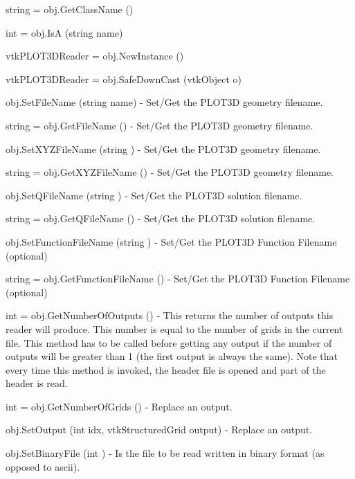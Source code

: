 \begin{DoxyItemize}
\item {\ttfamily string = obj.\-Get\-Class\-Name ()}  
\item {\ttfamily int = obj.\-Is\-A (string name)}  
\item {\ttfamily vtk\-P\-L\-O\-T3\-D\-Reader = obj.\-New\-Instance ()}  
\item {\ttfamily vtk\-P\-L\-O\-T3\-D\-Reader = obj.\-Safe\-Down\-Cast (vtk\-Object o)}  
\item {\ttfamily obj.\-Set\-File\-Name (string name)} -\/ Set/\-Get the P\-L\-O\-T3\-D geometry filename.  
\item {\ttfamily string = obj.\-Get\-File\-Name ()} -\/ Set/\-Get the P\-L\-O\-T3\-D geometry filename.  
\item {\ttfamily obj.\-Set\-X\-Y\-Z\-File\-Name (string )} -\/ Set/\-Get the P\-L\-O\-T3\-D geometry filename.  
\item {\ttfamily string = obj.\-Get\-X\-Y\-Z\-File\-Name ()} -\/ Set/\-Get the P\-L\-O\-T3\-D geometry filename.  
\item {\ttfamily obj.\-Set\-Q\-File\-Name (string )} -\/ Set/\-Get the P\-L\-O\-T3\-D solution filename.  
\item {\ttfamily string = obj.\-Get\-Q\-File\-Name ()} -\/ Set/\-Get the P\-L\-O\-T3\-D solution filename.  
\item {\ttfamily obj.\-Set\-Function\-File\-Name (string )} -\/ Set/\-Get the P\-L\-O\-T3\-D Function Filename (optional)  
\item {\ttfamily string = obj.\-Get\-Function\-File\-Name ()} -\/ Set/\-Get the P\-L\-O\-T3\-D Function Filename (optional)  
\item {\ttfamily int = obj.\-Get\-Number\-Of\-Outputs ()} -\/ This returns the number of outputs this reader will produce. This number is equal to the number of grids in the current file. This method has to be called before getting any output if the number of outputs will be greater than 1 (the first output is always the same). Note that every time this method is invoked, the header file is opened and part of the header is read.  
\item {\ttfamily int = obj.\-Get\-Number\-Of\-Grids ()} -\/ Replace an output.  
\item {\ttfamily obj.\-Set\-Output (int idx, vtk\-Structured\-Grid output)} -\/ Replace an output.  
\item {\ttfamily obj.\-Set\-Binary\-File (int )} -\/ Is the file to be read written in binary format (as opposed to ascii).  

\end{DoxyItemize}
